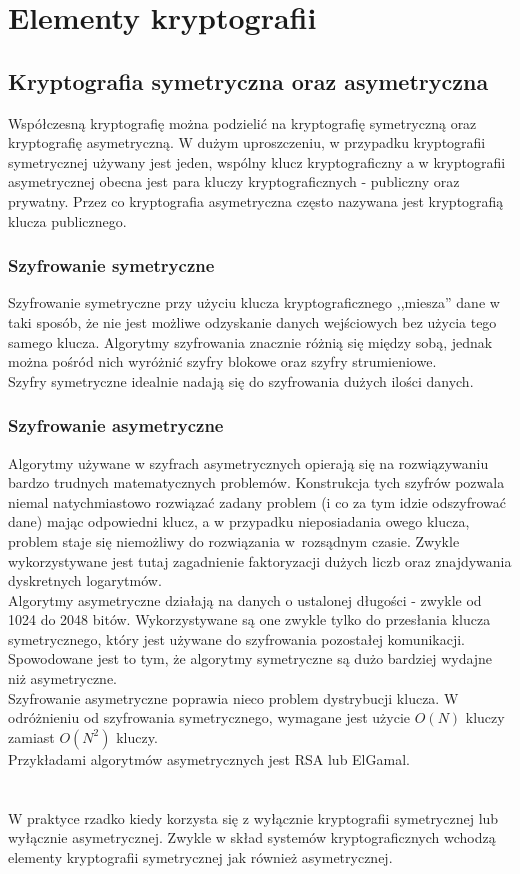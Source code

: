 \chapter{Elementy kryptografii}

\section{Kryptografia symetryczna oraz asymetryczna}
Współczesną kryptografię można podzielić na kryptografię symetryczną oraz kryptografię asymetryczną. 
W dużym uproszczeniu, w przypadku kryptografii symetrycznej używany jest jeden, wspólny klucz kryptograficzny a w kryptografii asymetrycznej obecna jest para kluczy kryptograficznych - publiczny oraz prywatny. Przez co kryptografia asymetryczna często nazywana jest kryptografią klucza publicznego. 

\subsection{Szyfrowanie symetryczne}
Szyfrowanie symetryczne przy użyciu klucza kryptograficznego ,,miesza'' dane w taki sposób, że nie jest możliwe odzyskanie danych wejściowych bez użycia tego samego klucza. Algorytmy szyfrowania znacznie różnią się między sobą, jednak można pośród nich wyróżnić szyfry blokowe oraz szyfry strumieniowe. \\
Szyfry symetryczne idealnie nadają się do szyfrowania dużych ilości danych. 

\subsection{Szyfrowanie asymetryczne}
Algorytmy używane w szyfrach asymetrycznych opierają się na rozwiązywaniu bardzo trudnych matematycznych problemów. 
Konstrukcja tych szyfrów pozwala niemal natychmiastowo rozwiązać zadany problem (i co za tym idzie odszyfrować dane) mając odpowiedni klucz, a w przypadku nieposiadania owego klucza, problem staje się niemożliwy do rozwiązania w~rozsądnym czasie.
Zwykle wykorzystywane jest tutaj zagadnienie faktoryzacji dużych liczb oraz znajdywania dyskretnych logarytmów. \\
Algorytmy asymetryczne działają na danych o ustalonej długości - zwykle od 1024 do 2048 bitów. Wykorzystywane są one zwykle tylko do przesłania klucza symetrycznego, który jest używane do szyfrowania pozostałej komunikacji. 
Spowodowane jest to tym, że algorytmy symetryczne są dużo bardziej wydajne niż asymetryczne. \\
Szyfrowanie asymetryczne poprawia nieco problem dystrybucji klucza. W odróżnieniu od szyfrowania symetrycznego, wymagane jest użycie $O(N)$ kluczy zamiast $O(N^2)$ \mbox{kluczy}. \\ 
Przykładami algorytmów asymetrycznych jest RSA lub ElGamal. \\ \\ \\
W praktyce rzadko kiedy korzysta się z wyłącznie kryptografii symetrycznej lub wyłącznie asymetrycznej. Zwykle w skład systemów kryptograficznych wchodzą elementy kryptografii symetrycznej jak również asymetrycznej.

